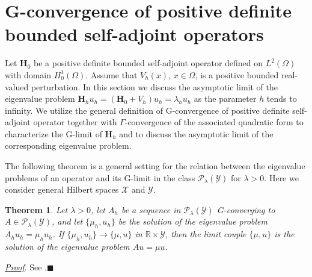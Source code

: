 \documentclass[11pt, epsf]{amsart}
\newtheorem{Theo}{Theorem}
\begin{document}
\section{G-convergence of positive definite bounded self-adjoint operators}

Let $\mathbf{H}_0$ be a positive definite bounded self-adjoint operator defined on $L^2(\Omega)$ with domain $H^1_0(\Omega)$. Assume that $V_h(x)$, $x\in\Omega$, is a positive bounded real-valued perturbation. In this section we discuss the asymptotic limit of the eigenvalue problem $\mathbf{H}_hu_h=(\mathbf{H}_0+V_h)u_h=\lambda_hu_h$ as the parameter $h$ tends to infinity. We utilize the general definition of G-convergence of positive definite self-adjoint operator together with $\Gamma$-convergence of the associated quadratic form to characterize the G-limit of $\mathbf{H}_h$ and to discuss the asymptotic limit of the corresponding eigenvalue problem.

The following theorem is a general setting for the relation between the eigenvalue problems of an operator and its G-limit in the class $\mathcal{P}_\lambda (\mathcal{Y})$ for $\lambda>0$. Here we consider general Hilbert spaces $\mathcal{X}$ and $\mathcal{Y}$.

\begin{Theo}
\emph{
Let $\lambda>0$, let $A_h$ be a sequence in $\mathcal{P}_\lambda(\mathcal{Y})$ G-converging to $A\in\mathcal{P}_\lambda(\mathcal{Y})$,
and let $\{\mu_h,u_h\}$ be the solution of the eigenvalue problem $A_hu_h=\mu_hu_h$. If
$\{\mu_h,u_h\}\rightarrow \{\mu,u\}$ in $\mathbb{R}\times\mathcal{Y}$, then the limit couple $\{\mu,u\}$ is the solution of the eigenvalue problem $Au=\mu u$.
}
\end{Theo}
\hspace{-4mm}\underline{\emph{Proof}}. See \cite{ALM}.\hfill{$\blacksquare$}\\
\end{document}
